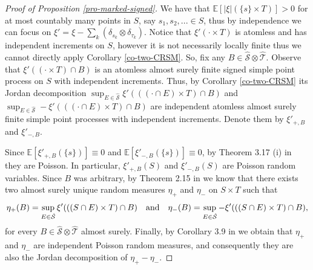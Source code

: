 \documentclass{article}
\theoremstyle{plain}
\theoremstyle{remark}
\begin{document}
\begin{proof}[Proof of Proposition \ref{pro-marked-signed}]
	We have that $\mathbb{E}[|\xi|(\{s\}\times T)]>0$ for at most countably many points in $S$, say $s_1,s_2,...\in S$, thus by independence we can focus on $\xi'=\xi-\sum_{k}(\delta_{s_k}\otimes\delta_{\tau_k})$. Notice that $\xi'(\cdot\times T)$ is atomless and has independent increments on $S$, however it is not necessarily locally finite thus we cannot directly apply Corollary \ref{co-two-CRSM}.  So, fix any $B\in \hat{\mathcal{S}}\otimes\hat{\mathcal{T}}$. Observe that $\xi'((\cdot\times T)\cap B)$ is an atomless almost surely finite signed simple point process on $S$ with independent increments. Thus, by Corollary  \ref{co-two-CRSM} its Jordan decomposition $\sup_{E\in \hat{\mathcal{S}}}\xi'(((\cdot\cap E)\times T)\cap B)$ and $\sup_{E\in \hat{\mathcal{S}}}-\xi'(((\cdot\cap E)\times T)\cap B)$ are independent atomless almost surely finite simple point processes with independent increments. Denote them by $\xi'_{+,B}$ and $\xi'_{-,B}$. 
	
	Since $\mathbb{E}[\xi'_{+,B}(\{s\})]\equiv0$ and $\mathbb{E}[\xi'_{-,B}(\{s\})]\equiv0$, by Theorem 3.17 (i) in \cite{Kallenberg2} they are Poisson. In particular, $\xi'_{+,B}(S)$ and $\xi'_{-,B}(S)$ are Poisson random variables. Since $B$ was arbitrary, by Theorem 2.15 in \cite{Kallenberg2} we know that there exists two almost surely unique random measures $\eta_+$ and $\eta_-$ on $S\times T$ such that 
	\begin{equation*}
		\eta_+(B)=\sup_{E\in \hat{\mathcal{S}}}\xi'(((S\cap E)\times T)\cap B)\quad\textnormal{and}\quad
		\eta_-(B)=\sup_{E\in \hat{\mathcal{S}}}-\xi'(((S\cap E)\times T)\cap B),
	\end{equation*}
	for every $B\in \hat{\mathcal{S}}\otimes\hat{\mathcal{T}}$ almost surely. Finally, by Corollary 3.9 in \cite{Kallenberg2} we obtain that $\eta_+$ and $\eta_-$ are independent Poisson random measures, and consequently they are also the Jordan decomposition of $\eta_+-\eta_-$.
\end{proof}
\end{document}
